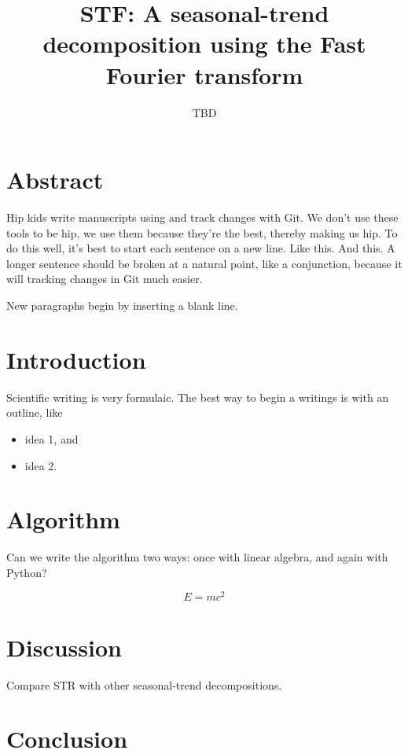 \documentclass{article}
\title{STF: A seasonal-trend decomposition using the Fast Fourier transform}
\author[1]{TBD}
\affil[1]{U.S. Geological Survey Central Midwest Water Science Center}
\date{}
\begin{document}
\maketitle

\section{Abstract}
Hip kids write manuscripts using \LaTex and track changes with Git.
We don't use these tools to be hip, we use them because they're the best,
thereby making us hip.
To do this well, it's best to start each sentence on a new line.
Like this.
And this.
A longer sentence should be broken at a natural point, like a conjunction,
because it will tracking changes in Git much easier.

New paragraphs begin by inserting a blank line.

\section{Introduction}
Scientific writing is very formulaic.
The best way to begin a writings is with an outline, like
\begin{itemize}
  \item idea 1, and
  \item idea 2.
\end{itemize}

\section{Algorithm}
Can we write the algorithm two ways:
once with linear algebra,
and again with Python?

\begin{equation}
  E = mc^2
\end{equation}

\section{Discussion}
Compare STR with other seasonal-trend decompositions.

\section{Conclusion}
\end{document}

